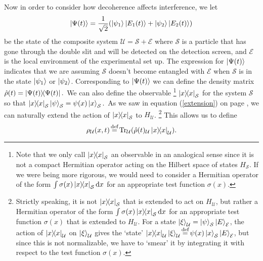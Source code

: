 \documentclass[letter, 12pt]{turabian-thesis}
\theoremstyle{hypothesis}
\newcommand\myeq{\stackrel{\mathclap{\scriptsize\mbox{def}}}{=}}
\let\origfootnote\footnote %
\renewcommand{\footnote}[1]{%
\noindent %
\origfootnote{#1}}
\renewcommand{\Tr}{\operatorname{Tr}}
\begin{document}
Now in order to consider how decoherence affects interference, we let $$\ket{\Psi(t)}=\frac{1}{\sqrt{2}}(\ket{\psi_1}\ket{E_1(t)}+\ket{\psi_2}\ket{E_2(t)})$$ be the state of the composite system $\mathcal{U}=\mathcal{S}+\mathcal{E}$ where $\mathcal{S}$ is a particle that has gone through the double slit and will be detected on the detection screen, and $\mathcal{E}$ is the local environment of the experimental set up. The expression for $\ket{\Psi(t)}$ indicates that we are assuming  $\mathcal{S}$ doesn't become entangled with $\mathcal{E}$ when $\mathcal{S}$ is in the state $\ket{\psi_1}$ or $\ket{\psi_2}$. Corresponding to $\ket{\Psi(t)}$ we can define the density matrix  $\hat{\rho}(t)=\dyad{\Psi(t)}.$  We can also define the observable\footnote{Note that we only call $\dyad{x}_\mathcal{S}$ an observable in an analogical sense since it is not a compact Hermitian operator acting on the Hilbert space of states $H_\mathcal{S}$. If we were being more rigorous, we would need to consider a Hermitian operator of the form $\int \sigma(x)\dyad{x}_\mathcal{S}\dd x$ for an appropriate test function $\sigma(x)$. } $\dyad{x}_\mathcal{S}$ for the system $\mathcal{S}$ so that $\dyad{x}_\mathcal{S}\ket{\psi}_\mathcal{S}=\psi(x)\ket{x}_\mathcal{S}.$ As we saw in equation (\ref{extension}) on page \pageref{extension}, we can naturally extend the action of $\dyad{x}_\mathcal{S}$ to $H_\mathcal{U}$.\footnote{Strictly speaking, it is not $\dyad{x}_\mathcal{S}$ that is extended to act on $H_\mathcal{U}$, but rather a Hermitian operator of the form $\int \sigma(x)\dyad{x}_\mathcal{S}\dd x$ for an appropriate test function $\sigma(x)$ that is extended to $H_\mathcal{U}$. For a state $\ket{\xi}_\mathcal{U}=\ket{\psi}_\mathcal{S}\ket{E}_\mathcal{E}$, the action of $\dyad{x}_\mathcal{U}$ on $\ket{\xi}_\mathcal{U}$ gives the `state' $\dyad{x}_\mathcal{U}\ket{\xi}_\mathcal{U}\myeq\psi(x)\ket{x}_\mathcal{S}\ket{E}_\mathcal{E}$, but since this is not normalizable, we have to `smear' it by integrating it with respect to the test function $\sigma(x)$.}  
This allows us to define 
$$\rho_\mathcal{U}(x, t)\myeq\Tr_\mathcal{U}(\hat{\rho}(t)_\mathcal{U}\dyad{x}_\mathcal{U}).$$
\end{document}
